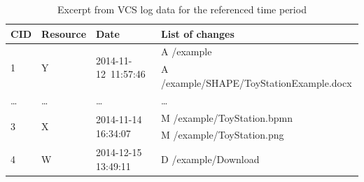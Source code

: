 \begin{table}[bt]
\caption{Excerpt from VCS log data for the referenced time period }
\label{tab:bpm2015example}
{
\centering
\begin{tabular}{m{.8cm} m{1.5cm} m{3cm} p{5.8cm}}
\toprule
\textbf{CID}	 & \textbf{Resource} & \textbf{Date} & \textbf{List of changes} \\
\midrule
\multirow{2}{*}{1} & \multirow{2}{*}{Y} & \multirow{2}{*}{2014-11-12~11:57:46} & A /example \\
& & & A \slash example\slash SHAPE\slash\-ToyStation\-Example.docx \\ \midrule %


\ldots & \ldots & \ldots & \ldots \\ \midrule

\multirow{2}{*}{3} & \multirow{2}{*}{X} & \multirow{2}{*}{2014-11-14 16:34:07} & M /example/ToyStation.bpmn\\
& & & M /example/ToyStation.png \\ \midrule%



4 & W & 2014-12-15 13:49:11 & D /example/Download \\ \midrule %


\end{tabular}}
\end{table}
